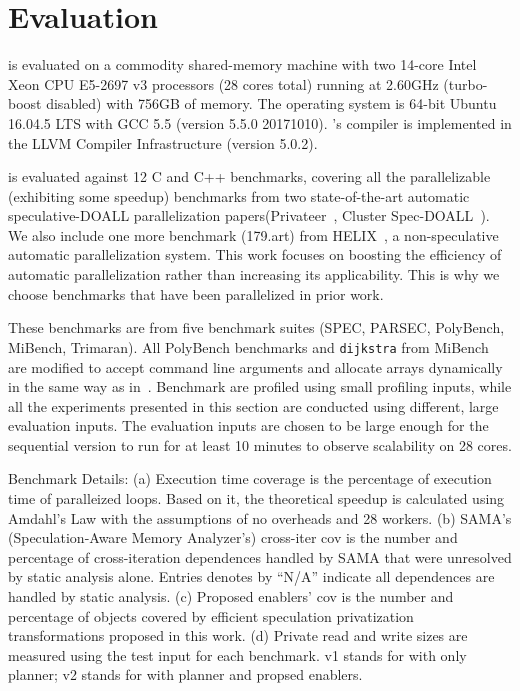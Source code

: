 \section{Evaluation}

\name is evaluated on a commodity shared-memory machine with two 14-core
Intel Xeon CPU E5-2697 v3 processors (28 cores total) running at 2.60GHz
(turbo-boost disabled) with 756GB of memory. The operating system is
64-bit Ubuntu 16.04.5 LTS with GCC 5.5 (version 5.5.0 20171010).
\namensp's compiler is implemented in the LLVM Compiler Infrastructure
(version 5.0.2).

\name is evaluated against 12 C and C++ benchmarks, covering all the
parallelizable (exhibiting some speedup) benchmarks from two
state-of-the-art automatic speculative-DOALL parallelization
papers(Privateer~\cite{johnson:12:pldi}, Cluster
Spec-DOALL~\cite{kim:12:cgo}). We also include one more benchmark
(179.art) from HELIX~\cite{simone:12:cgo}, a non-speculative automatic
parallelization system.  This work focuses on boosting the efficiency
of automatic parallelization rather than increasing its applicability.
This is why we choose benchmarks that have been parallelized in prior
work.

These benchmarks are from five benchmark suites (SPEC\cite{},
PARSEC\cite{bienia:08:parsec}, PolyBench\cite{},
MiBench\cite{guthaus:2001:iiwsc}, Trimaran\cite{trimaran:web}). All
PolyBench benchmarks and \texttt{dijkstra} from MiBench are modified
to accept command line arguments and allocate arrays dynamically in
the same way as in~\cite{johnson:12:pldi, kim:12:cgo}.
%
%
Benchmark are profiled using small profiling inputs, while all the
experiments presented in this section are conducted using different,
large evaluation inputs. The evaluation inputs are chosen to be large
enough for the sequential version to run for at least 10 minutes to
observe scalability on 28 cores.


\begin{table}[h]
  \centering
  
  \caption{
    Benchmark Details: (a) Execution time coverage is the percentage of
  execution time of paralleized loops. Based on it, the theoretical speedup
  is calculated using Amdahl's Law with the assumptions of no overheads and
  28 workers.  (b) SAMA's (Speculation-Aware Memory Analyzer's) cross-iter
  cov is the number and percentage of cross-iteration dependences handled
  by SAMA that were unresolved by static analysis alone. Entries denotes by
  ``N/A'' indicate all dependences are handled by static analysis.  (c)
  Proposed enablers’ cov is the number and percentage of objects
  covered by efficient speculation privatization transformations proposed
  in this work. (d) Private read and write sizes are measured using the
  test input for each benchmark. v1 stands for
  \name with only planner; v2 stands for \name with
  planner and propsed enablers.}
  \label{tab:benchmark-list}
    \vspace{-5pt}
\end{table}

